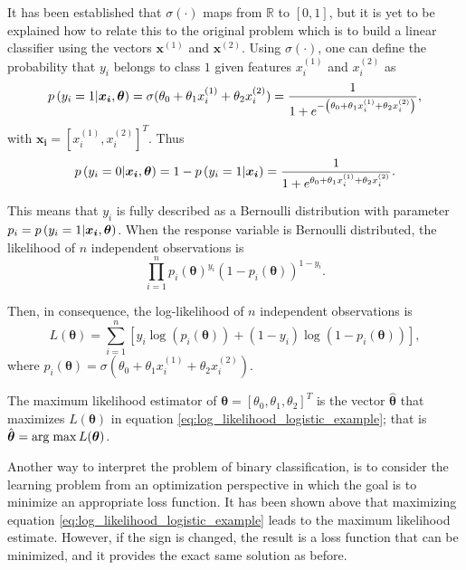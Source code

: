 It has been established that $\sigma \left( \cdot \right)$ maps from $\mathbb{R}$ to $\left[ 0,1 \right]$, but it is yet to be explained how to relate this to the original problem which is to build a linear classifier using the vectors $\boldsymbol{x}^{(1)}$ and $\boldsymbol{x}^{(2)}$. Using  $\sigma \left( \cdot \right)$, one can define the probability that $y_i$ belongs to class $1$ given features $x_i^{(1)}$ and $x_i^{(2)}$ as
\begin{equation}
  p\left( y_i = 1 | \boldsymbol{x_i}, \boldsymbol{\theta} \right) = \sigma(\theta_0 + \theta_1 x_i^{(1)} + \theta_2 x_i^{(2)}) = \frac{1}{1 + e^{-\left( \theta_0 + \theta_1 x_i^{(1)} + \theta_2 x_i^{(2)} \right)}},
\end{equation}
with $\boldsymbol{x_i} = \left[ x_i^{(1)}, x_i^{(2)} \right]^T$. Thus
\begin{equation}
  p\left( y_i = 0 | \boldsymbol{x_i}, \boldsymbol{\theta} \right) = 1 - p\left( y_i = 1 | \boldsymbol{x_i} \right) = \frac{1}{1 + e^{\theta_0 + \theta_1 x_i^{(1)} + \theta_2 x_i^{(2)}}}.
\end{equation}

This means that $y_i$ is fully described as a Bernoulli distribution with parameter $p_i =p\left( y_i = 1 | \boldsymbol{x_i}, \boldsymbol{\theta} \right)$. When the response variable is Bernoulli distributed, the likelihood of $n$ independent observations is
\begin{equation}
  \prod_{i = 1}^n  p_i(\boldsymbol{\theta})^{y_i}\left(1 - p_i(\boldsymbol{\theta}) \right)^{1 - y_i}.
\end{equation}

Then, in consequence, the log-likelihood of $n$ independent observations is
\begin{equation}
  \label{eq:log_likelihood_logistic_example}
  L(\boldsymbol{\theta}) = \sum_{i = 1}^n \left[ y_i \log\left( p_i(\boldsymbol{\theta}) \right) + (1 - y_i) \log \left( 1 - p_i(\boldsymbol{\theta}) \right) \right],
\end{equation}
where $p_i(\boldsymbol{\theta}) = \sigma(\theta_0 + \theta_1 x_i^{(1)} + \theta_2 x_i^{(2)})$.

The maximum likelihood estimator of $\boldsymbol{\theta} = \left[ \theta_0, \theta_1, \theta_2 \right]^T$ is the vector $\hat{\boldsymbol{\theta}}$ that maximizes $L(\boldsymbol{\theta})$ in equation \eqref{eq:log_likelihood_logistic_example}; that is $\hat{\boldsymbol{\theta}} = \operatorname*{arg\; max} L(\boldsymbol{\theta})$.

Another way to interpret the problem of binary classification, is to consider the learning problem from an optimization perspective in which the goal is to minimize an appropriate loss function. It has been shown above that maximizing equation \eqref{eq:log_likelihood_logistic_example} leads to the maximum likelihood estimate. However, if the sign is changed, the result is a loss function that can be minimized, and it provides the exact same solution as before.

